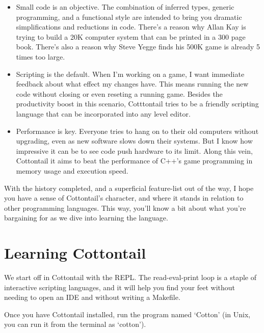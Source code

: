 \begin{itemize}
\item Small code is an objective. The combination of inferred types,
generic programming, and a functional style are intended to bring you
dramatic simplifications and reductions in code. There's a reason why
Allan Kay is trying to build a 20K computer system that can be printed
in a 300 page book. There's also a reason why Steve Yegge \cite{500K}
finds his 500K game is already 5 times too large.

\item Scripting is the default. When I'm working on a game, I want
immediate feedback about what effect my changes have. This means
running the new code without closing or even reseting a running game.
Besides the productivity boost in this scenario, Cotttontail tries to
be a friendly scripting language that can be incorporated into any
level editor.

\item Performance is key. Everyone tries to hang on to their old
computers without upgrading, even as new software slows down their
systems. But I know how impressive it can be to see code push hardware
to its limit. Along this vein, Cottontail it aims to beat the
performance of C++'s game programming in memory usage and execution
speed.

\end{itemize}

With the history completed, and a superficial feature-list out of the
way, I hope you have a sense of Cottontail's character, and where it
stands in relation to other programming languages. This way, you'll
know a bit about what you're bargaining for as we dive into learning
the language.

\section{Learning Cottontail}

We start off in Cottontail with the REPL. The read-eval-print loop
is a staple of interactive scripting languages, and it will help you
find your feet without needing to open an IDE and without writing a
Makefile.

Once you have Cottontail installed, run the program named `Cotton'
(in Unix, you can run it from the terminal as `cotton').




